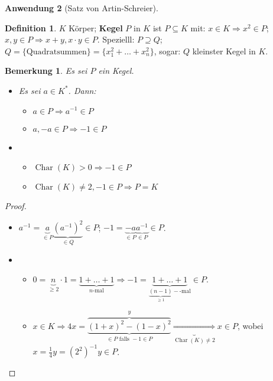 \documentclass[headsepline=true,DIV=11]{scrartcl}
\newtheorem*{remark}{Bemerkung}
\theoremstyle{definition}
\newtheorem*{definition}{Definition}
\newcommand{\Char}{\operatorname{Char}}
\begin{document}

{\bf Anwendung 2} (Satz von Artin-Schreier).

\begin{definition}
  $K$ Körper; {\bf Kegel} $P$ in $K$ ist $P\subseteq K$ mit: $x\in K\Rightarrow x^2\in P$; $x,y\in P\Rightarrow x+y, x\cdot y \in P$. Spezielll:
  $P\supseteq Q$; $Q=\{\mbox{Quadratsummen}\}=\{x_1^2+\ldots+x_n^2\}$, sogar: $Q$ kleinster Kegel in $K$.
\end{definition}

\begin{remark}
  Es sei $P$ ein Kegel.
  \begin{itemize}
  \item[a.] Es sei $a\in K^*$. Dann:
    \begin{itemize}
    \item $a\in P \Rightarrow a^{-1}\in P$
    \item $a,-a\in P\Rightarrow -1\in P$
    \end{itemize}
  \item[b.]
    \begin{itemize}
    \item $\Char(K)>0 \Rightarrow -1\in P$
    \item $\Char(K)\neq 2, -1\in P \Rightarrow P=K$
    \end{itemize}
  \end{itemize}
\end{remark}

\begin{proof}
  \begin{itemize}
  \item[a.] $a^{-1}=\underbrace{a}_{\in P}\underbrace{(a^{-1})^2}_{\in Q}\in P$; $-1=\underbrace{-a}_{\in P}\underbrace{a^{-1}}_{\in P}\in P$.
  \item[b.]
    \begin{itemize}
    \item $0 = \underbrace{n}_{\ge 2}\cdot 1=\underbrace{1+\ldots+1}_{n\mbox{-mal}} \Rightarrow -1 = \underbrace{1+\ldots+1}_{\underbrace{(n-1)}_{\ge
        1}-\mbox{-mal}} \in P$.
    \item $x\in K \Rightarrow 4x=\underbrace{\overbrace{(1+x)^2-(1-x)^2}^y}_{\in P\mbox{ falls }-1\in P} \underbrace{\Rightarrow}_{\Char(K)\neq 2}
      x\in P$, wobei $x=\frac{1}{4}y=(2^2)^{-1}y\in P$.
    \end{itemize}
  \end{itemize}
\end{proof}
\end{document}
